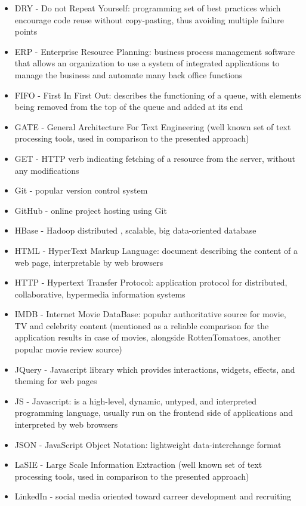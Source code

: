 \begin{itemize}
\item DRY -  Do not Repeat Yourself: programming set of best practices which encourage code reuse without copy-pasting, thus avoiding multiple failure points
\item ERP - Enterprise Resource Planning: business process management software that allows an organization to use a system of integrated applications to manage the business and automate many back office functions
\item FIFO - First In First Out: describes the functioning of a queue, with elements being removed from the top of the queue and added at its end
\item GATE - General Architecture For Text Engineering (well known set of text processing tools, used in comparison to the presented approach)
\item GET - HTTP verb indicating fetching of a resource from the server, without any modifications
\item Git - popular version control system
\item GitHub - online project hosting using Git
\item HBase - Hadoop distributed , scalable, big data-oriented database
\item HTML - HyperText Markup Language: document describing the content of a web page, interpretable by web browsers
\item HTTP - Hypertext Transfer Protocol: application protocol for distributed, collaborative, hypermedia information systems
\item IMDB - Internet Movie DataBase: popular authoritative source for movie, TV and celebrity content (mentioned as a reliable comparison for the application results in case of movies, alongside RottenTomatoes, another popular movie review source)
\item JQuery - Javascript library which provides interactions, widgets, effects, and theming for web pages
\item JS - Javascript: is a high-level, dynamic, untyped, and interpreted programming language, usually run on the frontend side of applications and interpreted by web browsers
\item JSON - JavaScript Object Notation: lightweight data-interchange format
\item LaSIE - Large Scale Information Extraction (well known set of text processing tools, used in comparison to the presented approach)
\item LinkedIn - social media oriented toward carreer development and recruiting

\end{itemize}
